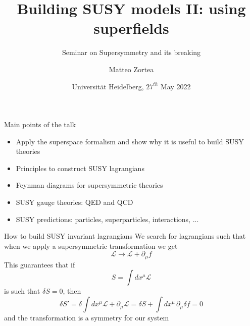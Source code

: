 \documentclass[10pt]{beamer}
\title{Building SUSY models II: using superfields}
\subtitle{Seminar on Supersymmetry and its breaking}
\author{Matteo Zortea}
\date{Universit\"at Heidelberg, $27^{th}$ May 2022}
\institute{Coordinated by prof. J\"org J\"ackel}
\begin{document}
\begin{frame}
\titlepage
\end{frame}

\begin{frame}{Main points of the talk}
\begin{itemize}
    \item Apply the superspace formalism and show why it is useful to build SUSY theories
    \item Principles to construct SUSY lagrangians 
    \item Feynman diagrams for supersymmetric theories
    \item SUSY gauge theories: QED and QCD
    \item SUSY predictions: particles, superparticles, interactions, ...
\end{itemize}
\end{frame}

\begin{frame}{How to build SUSY invariant lagrangians}
    We search for lagrangians such that when we apply a supersymmetric transformation we get 
        \begin{equation*}
            \mathcal{L} \to \mathcal{L} + \partial_{\mu} f
        \end{equation*}
    This guarantees that if 
    \begin{equation*}
        S = \int dx^\mu \mathcal{L}
    \end{equation*} 
    is such that $\delta S = 0$, then
    \begin{equation*}
        \delta S' = \delta \int dx^{\mu} \mathcal{L} + \partial_\mu \mathcal{L} = \delta S + \int dx^\mu \, \partial_\mu \delta f = 0
    \end{equation*}
    and the transformation is a symmetry for our system
\end{frame}
\end{document}
